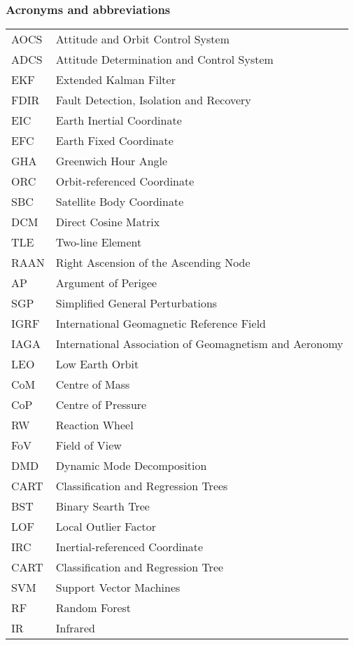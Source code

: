 \newpage
\subsubsection*{Acronyms and abbreviations}

\begingroup
\renewcommand{\arraystretch}{1.2}
\begin{tabular}{@{}p{2.5cm} l}
    AOCS	& Attitude and Orbit Control System \\
    ADCS	& Attitude Determination and Control System \\
    EKF		& Extended Kalman Filter \\
    FDIR	& Fault Detection, Isolation and Recovery \\
    EIC		& Earth Inertial Coordinate \\
    EFC		& Earth Fixed Coordinate \\
    GHA 	& Greenwich Hour Angle \\
    ORC 	& Orbit-referenced Coordinate \\
    SBC 	& Satellite Body Coordinate \\
    DCM 	& Direct Cosine Matrix \\
    TLE 	& Two-line Element \\
    RAAN	& Right Ascension of the Ascending Node \\
    AP		& Argument of Perigee \\
    SGP 	& Simplified General Perturbations \\
    IGRF	& International Geomagnetic Reference Field \\
    IAGA	& International Association of Geomagnetism and Aeronomy \\
    LEO		& Low Earth Orbit \\
    CoM		& Centre of Mass \\
    CoP 	& Centre of Pressure \\
    RW		& Reaction Wheel \\
    FoV		& Field of View \\
    DMD 	& Dynamic Mode Decomposition \\    
    CART	& Classification and Regression Trees \\
    BST		& Binary Searth Tree \\
    LOF		& Local Outlier Factor \\
    IRC		& Inertial-referenced Coordinate \\
    CART	& Classification and Regression Tree \\
    SVM		& Support Vector Machines \\
    RF		& Random Forest \\
    IR		& Infrared
    
\end{tabular}
\endgroup
